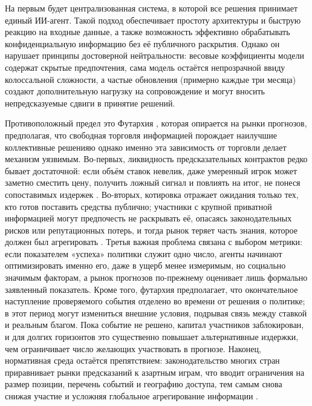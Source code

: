 \documentclass[
    14pt,
    specialist,
    candidate, %
    subf, %
    href,
    dotsinheaders=false
]{disser}
\begin{document}
На первым будет централизованная система, в которой все решения принимает единый ИИ-агент. Такой подход обеспечивает простоту архитектуры и быструю реакцию на входные данные, а также возможность эффективно обрабатывать конфиденциальную информацию без её публичного раскрытия. Однако он нарушает принципы достоверной нейтральности: весовые коэффициенты модели содержат скрытые предпочтения, сама модель остаётся непрозрачной ввиду колоссальной сложности, а частые обновления (примерно каждые три месяца) создают дополнительную нагрузку на сопровождение и могут вносить непредсказуемые сдвиги в принятие решений.

Противоположный предел это Футархия \cite{Hanson2000}, которая опирается на рынки прогнозов, предполагая, что свободная торговля информацией порождает наилучшие коллективные решенияю однако именно эта зависимость от торговли делает механизм уязвимым. Во-первых, ликвидность предсказательных контрактов редко бывает достаточной: если объём ставок невелик, даже умеренный игрок может заметно сместить цену, получить ложный сигнал и повлиять на итог, не понеся сопоставимых издержек \cite{Othman2013}. Во-вторых, котировка отражает ожидания только тех, кто готов поставить средства публично; участники с крупной приватной информацией могут предпочесть не раскрывать её, опасаясь законодательных рисков или репутационных потерь, и тогда рынок теряет часть знания, которое должен был агрегировать \cite{Pennock2011}. Третья важная проблема связана с выбором метрики: если показателем «успеха» политики служит одно число, агенты начинают оптимизировать именно его, даже в ущерб менее измеримым, но социально значимым факторам, а рынок прогнозов по-прежнему оценивает лишь формально заявленный показатель. Кроме того, футархия предполагает, что окончательное наступление проверяемого события отделено во времени от решения о политике; в этот период могут измениться внешние условия, подрывая связь между ставкой и реальным благом. Пока событие не решено, капитал участников заблокирован, и для долгих горизонтов это существенно повышает альтернативные издержки, чем ограничивает число желающих участвовать в прогнозе. Наконец, нормативная среда остаётся препятствием: законодательство многих стран приравнивает рынки предсказаний к азартным играм, что вводит ограничения на размер позиции, перечень событий и географию доступа, тем самым снова снижая участие и усложняя глобальное агрегирование информации \cite{Buterin2025}.
\end{document}
